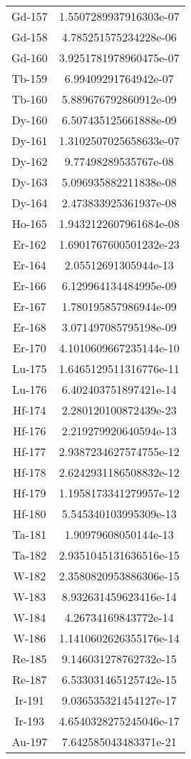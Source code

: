 \begin{table}[h!]
\begin{tabular}{|| c || c |}
Gd-157 & 1.5507289937916303e-07 \\
Gd-158 & 4.785251575234228e-06 \\
Gd-160 & 3.9251781978960475e-07 \\
Tb-159 & 6.99409291764942e-07 \\
Tb-160 & 5.889676792860912e-09 \\
Dy-160 & 6.507435125661888e-09 \\
Dy-161 & 1.3102507025658633e-07 \\
Dy-162 & 9.77498289535767e-08 \\
Dy-163 & 5.096935882211838e-08 \\
Dy-164 & 2.473833925361937e-08 \\
Ho-165 & 1.9432122607961684e-08 \\
Er-162 & 1.6901767600501232e-23 \\
Er-164 & 2.05512691305944e-13 \\
Er-166 & 6.129964134484995e-09 \\
Er-167 & 1.780195857986944e-09 \\
Er-168 & 3.071497085795198e-09 \\
Er-170 & 4.1010609667235144e-10 \\
Lu-175 & 1.6465129511316776e-11 \\
Lu-176 & 6.402403751897421e-14 \\
Hf-174 & 2.280120100872439e-23 \\
Hf-176 & 2.219279920640594e-13 \\
Hf-177 & 2.9387234627574755e-12 \\
Hf-178 & 2.6242931186508832e-12 \\
Hf-179 & 1.1958173341279957e-12 \\
Hf-180 & 5.545340103995309e-13 \\
Ta-181 & 1.90979608050144e-13 \\
Ta-182 & 2.9351045131636516e-15 \\
W-182 & 2.3580820953886306e-15 \\
W-183 & 8.932631459623416e-14 \\
W-184 & 4.26734169843772e-14 \\
W-186 & 1.1410602626355176e-14 \\
Re-185 & 9.146031278762732e-15 \\
Re-187 & 6.533031465125742e-15 \\
Ir-191 & 9.036535321454127e-17 \\
Ir-193 & 4.6540328275245046e-17 \\
Au-197 & 7.642585043483371e-21 \\

\end{tabular}
\end{table}
